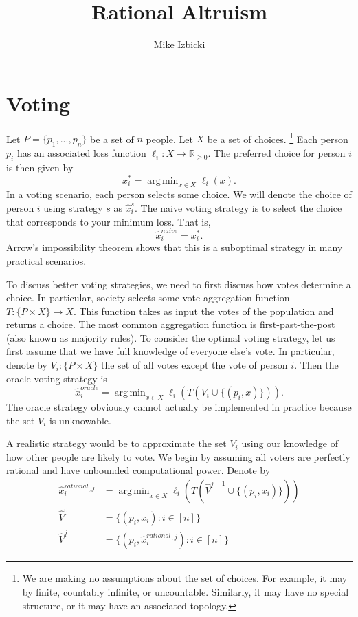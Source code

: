 \documentclass{article}
\title{Rational Altruism}
\author{Mike Izbicki}
\DeclareMathOperator*{\argmin}{arg\,min}
\newcommand{\loss}{\ell}
\newcommand{\x}{x}
\newcommand{\xstar}{\x^*}
\newcommand{\xhat}{\hat\x}
\newcommand{\xhats}{\xhat^s}
\newcommand{\xhatn}{\xhat^{\textit{naive}}}
\newcommand{\xhato}{\xhat^{\textit{oracle}}}
\newcommand{\xhatr}{\xhat^{\textit{rational}}}
\newcommand{\V}{V}
\newcommand{\Vhat}{\hat\V}
\newcommand{\T}{T}
\newcommand{\R}{\mathbb{R}}
\newcommand{\Rnn}{\R_{\ge0}}
\theoremstyle{definition}
\begin{document}
\maketitle


\section{Voting}

Let $P=\{p_1,...,p_n\}$ be a set of $n$ people.
Let $X$ be a set of choices.%
\footnote{
    We are making no assumptions about the set of choices.
    For example, it may by finite, countably infinite, or uncountable.
    Similarly, it may have no special structure, or it may have an associated topology.
}
Each person $p_i$ has an associated loss function $\loss_i : X \to \Rnn$.
The preferred choice for person $i$ is then given by
\begin{equation}
\xstar_i = \argmin_{\x\in X} \loss_i(\x)
.
\end{equation}
In a voting scenario, each person selects some choice.
We will denote the choice of person $i$ using strategy $s$ as $\xhats_i$.
The naive voting strategy is to select the choice that corresponds to your minimum loss.
That is,
\begin{equation}
\xhatn_i = \xstar_i
.
\end{equation}
Arrow's impossibility theorem shows that this is a suboptimal strategy in many practical scenarios.

To discuss better voting strategies, we need to first discuss how votes determine a choice.
In particular, society selects some vote aggregation function $\T : \{P\times X\} \to X$. 
This function takes as input the votes of the population and returns a choice.
The most common aggregation function is first-past-the-post (also known as majority rules).
To consider the optimal voting strategy, let us first assume that we have full knowledge of everyone else's vote.
In particular, denote by $V_i : \{P\times X\}$ the set of all votes except the vote of person $i$.
Then the oracle voting strategy is
\begin{equation}
\xhato_i = \argmin_{\x\in X} \loss_i(T(V_i\cup\{(p_i,\x)\}))
.
\end{equation}
The oracle strategy obviously cannot actually be implemented in practice because the set $V_i$ is unknowable.

A realistic strategy would be to approximate the set $V_i$ using our knowledge of how other people are likely to vote.
We begin by assuming all voters are perfectly rational and have unbounded computational power.
Denote by 
\begin{equation}
\begin{split}
\xhatr_i{}^{,j} &= \argmin_{\x\in X} \loss_i(T(\Vhat^{j-1} \cup \{(p_i,\x_i)\})) \\
\Vhat^0 &= \{(p_i,x_i) : i \in [n]\} \\
\Vhat^j &= \{(p_i,\xhatr_i{}^{,j}) : i \in [n]\}
\end{split}
\end{equation}
\end{document}
